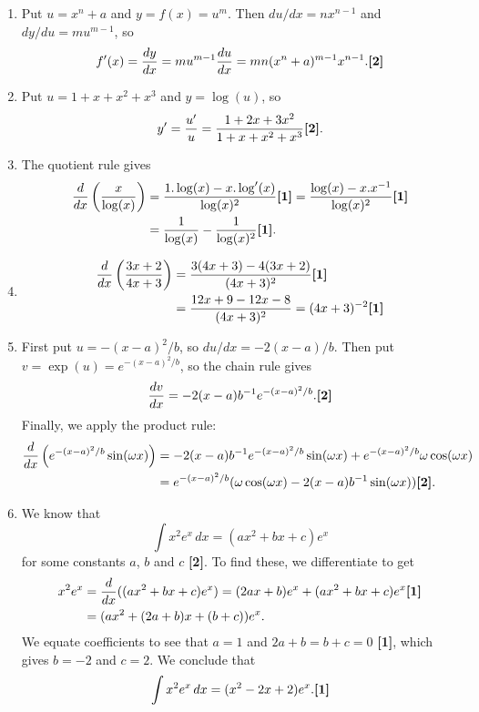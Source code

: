 \documentclass{amsart}
\newcommand{\om}{\omega}
\renewcommand{\:}       {\colon}
\newcommand{\mks}[1]    {\mbox{\bf [#1]}}
\newcommand{\mk}        {\mbox{\bf [1]}}
\begin{document}
\begin{enumerate}
 \item %
  Put $u=x^n+a$ and $y=f(x)=u^m$.  Then $du/dx=nx^{n-1}$ and
  $dy/du=mu^{m-1}$, so 
  \[ f'(x) = \frac{dy}{dx} = mu^{m-1}\frac{du}{dx} = 
      mn(x^n+a)^{m-1}x^{n-1}. \mks{2}
  \]
 
 \item %
  Put $u=1+x+x^2+x^3$ and $y=\log(u)$, so 
  \[ y' = \frac{u'}{u} = \frac{1+2x+3x^2}{1+x+x^2+x^3} \mks{2}. \]

 \item %
  The quotient rule gives
  \begin{align*}
   \frac{d}{dx}\left(\frac{x}{\log(x)}\right) 
    &= \frac{1.\log(x) - x.\log'(x)}{\log(x)^2} \mk 
     = \frac{\log(x) - x.x^{-1}}{\log(x)^2}  \mk \\
    &= \frac{1}{\log(x)} - \frac{1}{\log(x)^2} \mk.
  \end{align*}

 \item %
  \begin{align*}
   \frac{d}{dx}\left(\frac{3x+2}{4x+3}\right) 
    &= \frac{3(4x+3)-4(3x+2)}{(4x+3)^2} \mk \\
    &= \frac{12x+9-12x-8}{(4x+3)^2} = (4x+3)^{-2} \mk   
  \end{align*}

 \item %
  First put $u=-(x-a)^2/b$, so $du/dx=-2(x-a)/b$.  Then put
  $v=\exp(u)=e^{-(x-a)^2/b}$, so the chain rule gives
  \[ \frac{dv}{dx} = -2(x-a)b^{-1}e^{-(x-a)^2/b}. \mks{2} \]
  Finally, we apply the product rule:
  \begin{align*}
   \frac{d}{dx}\left(e^{-(x-a)^2/b}\sin(\omega x)\right) &= 
    -2(x-a)b^{-1}e^{-(x-a)^2/b} \sin(\om x) + 
    e^{-(x-a)^2/b} \om\cos(\om x) \\
   &= e^{-(x-a)^2/b}(\om\cos(\om x) - 2(x-a)b^{-1}\sin(\om x)) \mks{2}.
  \end{align*}

 \item %
  We know that
  \[ \int x^2 e^x\, dx = (ax^2+bx+c) e^x \]
  for some constants $a$, $b$ and $c$ \mks{2}.  To find these, we
  differentiate to get 
  \begin{align*}
   x^2 e^x &= \frac{d}{dx}((ax^2+bx+c) e^x) 
    = (2ax+b)e^x + (ax^2+bx+c) e^x \mk \\
    &= (ax^2+(2a+b)x+(b+c))e^x.
  \end{align*}
  We equate coefficients to see that $a=1$ and $2a+b=b+c=0$ \mk, which
  gives $b=-2$ and $c=2$.  We conclude that
  \[ \int x^2 e^x\, dx = (x^2-2x+2) e^x. \mk \]


\end{enumerate}
\end{document}
